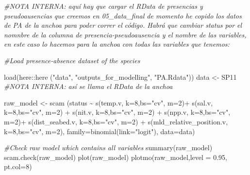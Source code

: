 \documentclass[
]{book}
\newenvironment{Shaded}{\begin{snugshade}}{\end{snugshade}}
\newcommand{\AttributeTok}[1]{\textcolor[rgb]{0.77,0.63,0.00}{#1}}
\newcommand{\CommentTok}[1]{\textcolor[rgb]{0.56,0.35,0.01}{\textit{#1}}}
\newcommand{\DecValTok}[1]{\textcolor[rgb]{0.00,0.00,0.81}{#1}}
\newcommand{\FloatTok}[1]{\textcolor[rgb]{0.00,0.00,0.81}{#1}}
\newcommand{\FunctionTok}[1]{\textcolor[rgb]{0.00,0.00,0.00}{#1}}
\newcommand{\NormalTok}[1]{#1}
\newcommand{\OtherTok}[1]{\textcolor[rgb]{0.56,0.35,0.01}{#1}}
\newcommand{\SpecialCharTok}[1]{\textcolor[rgb]{0.00,0.00,0.00}{#1}}
\newcommand{\StringTok}[1]{\textcolor[rgb]{0.31,0.60,0.02}{#1}}
\begin{document}
\begin{Shaded}
\begin{Highlighting}[]
\CommentTok{\#NOTA INTERNA: aquí hay que cargar el RData de presencias y pseudoausencias que creemos en 05\_data\_final de momento he copido los datos de PA de la anchoa para poder correr el código. Habrá que cambiar status por el nomnbre de la columna de presencia{-}pseudoausencia y el nombre de las variables, en este caso lo hacemos para la anchoa con todas las variables que tenemos: }

\CommentTok{\#Load presence{-}absence dataset of the species}

\FunctionTok{load}\NormalTok{(here}\SpecialCharTok{::}\FunctionTok{here}\NormalTok{ (}\StringTok{"data"}\NormalTok{, }\StringTok{"outputs\_for\_modelling"}\NormalTok{, }\StringTok{"PA.Rdata"}\NormalTok{))}
\NormalTok{data }\OtherTok{\textless{}{-}}\NormalTok{ SP11 }\CommentTok{\#NOTA INTERNA: así se llama el RData de la anchoa}


\NormalTok{raw\_model }\OtherTok{\textless{}{-}} \FunctionTok{scam}\NormalTok{ (status }\SpecialCharTok{\textasciitilde{}}  \FunctionTok{s}\NormalTok{(temp.v, }\AttributeTok{k=}\DecValTok{8}\NormalTok{,}\AttributeTok{bs=}\StringTok{"cv"}\NormalTok{, }\AttributeTok{m=}\DecValTok{2}\NormalTok{)}\SpecialCharTok{+} \FunctionTok{s}\NormalTok{(sal.v, }\AttributeTok{k=}\DecValTok{8}\NormalTok{,}\AttributeTok{bs=}\StringTok{"cv"}\NormalTok{, }\AttributeTok{m=}\DecValTok{2}\NormalTok{) }\SpecialCharTok{+} \FunctionTok{s}\NormalTok{(nit.v, }\AttributeTok{k=}\DecValTok{8}\NormalTok{,}\AttributeTok{bs=}\StringTok{"cv"}\NormalTok{, }\AttributeTok{m=}\DecValTok{2}\NormalTok{) }\SpecialCharTok{+} \FunctionTok{s}\NormalTok{(npp.v, }\AttributeTok{k=}\DecValTok{8}\NormalTok{,}\AttributeTok{bs=}\StringTok{"cv"}\NormalTok{, }\AttributeTok{m=}\DecValTok{2}\NormalTok{)}\SpecialCharTok{+} \FunctionTok{s}\NormalTok{(dist\_seabed.v, }\AttributeTok{k=}\DecValTok{8}\NormalTok{,}\AttributeTok{bs=}\StringTok{"cv"}\NormalTok{, }\AttributeTok{m=}\DecValTok{2}\NormalTok{) }\SpecialCharTok{+} \FunctionTok{s}\NormalTok{(mld\_relative\_position.v, }\AttributeTok{k=}\DecValTok{8}\NormalTok{,}\AttributeTok{bs=}\StringTok{"cv"}\NormalTok{, }\AttributeTok{m=}\DecValTok{2}\NormalTok{), }\AttributeTok{family=}\FunctionTok{binomial}\NormalTok{(}\AttributeTok{link=}\StringTok{"logit"}\NormalTok{), }\AttributeTok{data=}\NormalTok{data)}


\CommentTok{\#Check raw model which contains all variables}
\FunctionTok{summary}\NormalTok{(raw\_model)}
\FunctionTok{scam.check}\NormalTok{(raw\_model)}
\FunctionTok{plot}\NormalTok{(raw\_model)}
\FunctionTok{plotmo}\NormalTok{(raw\_model,}\AttributeTok{level =} \FloatTok{0.95}\NormalTok{, }\AttributeTok{pt.col=}\DecValTok{8}\NormalTok{)}
\end{Highlighting}
\end{Shaded}
\end{document}
